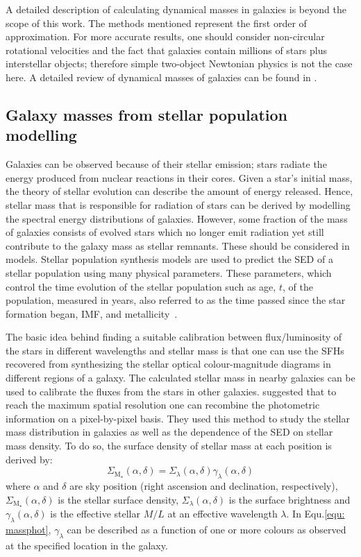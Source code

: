 A detailed description of calculating dynamical masses in galaxies is beyond the scope of this work. 
The methods mentioned represent the first order of approximation. 
For more accurate results, one should consider non-circular rotational velocities and the fact that galaxies contain millions of stars plus interstellar objects; therefore simple two-object Newtonian physics is not the case here. 
A detailed review of dynamical masses of galaxies can be found in \citet{Courteau13}.

\subsection{Galaxy masses from stellar population modelling}
Galaxies can be observed because of their stellar emission; stars radiate the energy produced from nuclear reactions in their cores. 
Given a star's initial mass, the theory of stellar evolution can describe the amount of energy released. 
Hence, stellar mass that is responsible for radiation of stars can be derived by modelling the spectral energy distributions of galaxies. 
However, some fraction of the mass of galaxies consists of evolved stars which no longer emit radiation yet still contribute to the galaxy mass as stellar remnants. These should be considered in models.
Stellar population synthesis models are used to predict the SED of a stellar population using many physical parameters. 
These parameters, which control the time evolution of the stellar population such as age, $t$, of the population, measured in years, also referred to as the time passed since the star formation began, IMF, and metallicity~\citep{Courteau13}.

The basic idea behind finding a suitable calibration between flux/luminosity of the stars in different wavelengths and stellar mass is that one can use the SFHs recovered from synthesizing the stellar optical colour-magnitude diagrams in different regions of a galaxy. 
The calculated stellar mass in nearby galaxies can be used to calibrate the fluxes from the stars in other galaxies.
\cite{Zibetti09} suggested that to reach the maximum spatial resolution one can recombine the photometric information on a pixel-by-pixel basis. 
They used this method to study the stellar mass distribution in galaxies as well as the dependence of the SED on stellar mass density.
To do so, the surface density of stellar mass at each position is derived by: 
\begin{equation}
\label{equ: massphot}
\Sigma_{{\mathrm M_\star}} (\alpha, \delta) = \Sigma_{\lambda}(\alpha, \delta) \gamma_{\lambda}(\alpha, \delta)
\end{equation}
where $\alpha$ and $\delta$ are sky position (right ascension and declination, respectively),
$\Sigma_{{\mathrm M_\star}} (\alpha, \delta)$ is the stellar surface density,
$\Sigma_{\lambda}(\alpha, \delta)$ is the surface brightness and $\gamma_{\lambda}(\alpha, \delta)$ is the effective stellar $M/L$ at an effective wavelength $\lambda$.
In Equ.\ref{equ: massphot},  $\gamma_{\lambda}$ can be described as a function of one or more colours as observed at the specified location in the galaxy. 

